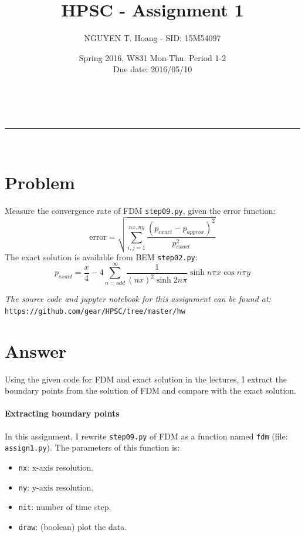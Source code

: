 \documentclass[a4paper,12pt]{article}
\makeatletter
\newcommand{\linia}{\rule{\linewidth}{0.5pt}}
\renewcommand{\maketitle} {%
\begin{center}
\vspace{2ex}
{\huge \textsc{\@title}}
\vspace{1ex}
\\
\linia\\
\@author \hfill \@date
\vspace{4ex}
\end{center}
}
\makeatother
\begin{document}

\title{HPSC - Assignment 1}

\author{NGUYEN T. Hoang - SID: 15M54097}

\date{Spring 2016, W831 Mon-Thu. Period 1-2 \\ \hfill Due date: 2016/05/10}

\maketitle

\vspace{2em}
\section*{Problem}
\noindent
Measure the convergence rate of FDM \texttt{step09.py}, given the error function:
$$ \mbox{error} = \sqrt{\sum_{i,j=1}^{nx,ny}\frac{(p_{exact} - p_{approx})^2}{p_{exact}^2}} $$
The exact solution is available from BEM \texttt{step02.py}:
$$ p_{exact} = \frac{x}{4} - 4 \sum_{n=odd}^{\infty} \frac{1}{(nx)^2\sinh{2n\pi}}\sinh{n\pi x}\cos{n\pi y} $$

\vspace{1.5em}
\noindent
\emph{The source code and jupyter notebook for this assignment can be found at:} \\
\texttt{https://github.com/gear/HPSC/tree/master/hw}
\pagebreak
\section*{Answer}

\noindent
Using the given code for FDM and exact solution in the lectures, I extract the boundary points from the solution of FDM and compare with the exact solution.

\paragraph{Extracting boundary points} In this assignment, I rewrite \texttt{step09.py} of FDM as a function named \texttt{fdm} (file: \texttt{assign1.py}). The parameters of this function is:
\begin{itemize}
  \setlength{\parskip}{0em}
  \item \texttt{nx}: x-axis resolution.
  \item \texttt{ny}: y-axis resolution.
  \item \texttt{nit}: number of time step.
  \item \texttt{draw}: (boolean) plot the data.
\end{itemize}
\end{document}
